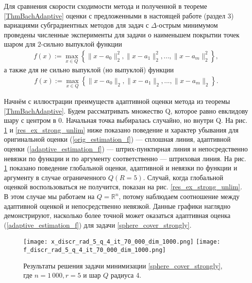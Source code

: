     Для сравнения скорости сходимости метода \cite{Bach_2012} и полученной в теореме \ref{ThmBachAdaptive} оценки с предложенными в настоящей работе (раздел 3) вариациями субградиентных методов для задач с $\Delta$-острым минимумом проведены численные эксперименты для задачи о наименьшем покрытии точек шаром для $2$-сильно выпуклой функции
    \begin{gather}\label{sphere_cover_strongly}
        f(x) := \max_{x\in Q}\left\{\|x - a_0\|_2^2, \|x - a_1\|_2^2, ..., \|x - a_m\|_2^2\right\},
    \end{gather}
    а также для не сильно выпуклой (но выпуклой) функции
    \begin{gather}\label{sphere_cover}
        f(x) := \max_{x\in Q}\left\{\|x - a_0\|_2, \|x - a_1\|_2, ..., \|x - a_m\|_2\right\}.
    \end{gather}

    Начнём с иллюстрации преимуществ адаптивной оценки метода \cite{Bach_2012} из теоремы \ref{ThmBachAdaptive}. Будем рассматривать множество Q, которое равно евклидову шару с центром в 0. Начальная точка выбиралась случайно, но внутри Q. На рис. \ref{res_ex_strong_r5} и \ref{res_ex_strong_unlim} ниже показано поведение и характер убывания для оригинальной оценки (\ref{orig_estimation_f}) --- сплошная линия, адаптивной оценки (\ref{adaptive_estimation_f}) --- штрих-пунктирная линия и непосредственно невязки по функции и по аргументу соответственно --- штриховая линия. На рис. \ref{res_ex_strong_r5} показано поведение глобальной оценки, адаптивной и невязки по функции и аргументу в случае ограниченного $Q (R = 5)$. Случай, когда глобальной оценкой воспользоваться не получится, показан на рис. \ref{res_ex_strong_unlim}. В этом случае мы работаем на $Q = \mathbb{R}^n$, потому наблюдаем соотношение между адаптивной оценкой и непосредственно невязкой. Данные графики наглядно демонстрируют, насколько более точной может оказаться адаптивная оценка (\ref{adaptive_estimation_f}) для задачи \eqref{sphere_cover_strongly}. 

    \begin{figure}[h]
        \texttt{[image: x\_discr\_rad\_5\_q\_4\_it\_70\_000\_dim\_1000.png]}
        \endminipage\hfill
        \texttt{[image: f\_discr\_rad\_5\_q\_4\_it\_70\_000\_dim\_1000.png]}
        \endminipage\hfill
        \caption{Результаты решения задачи минимизации \eqref{sphere_cover_strongly}, где  $n= 1\,000, r = 5$ и  шар $Q$ радиуса 4.}
        \label{res_ex_strong_r5}
    \end{figure}

